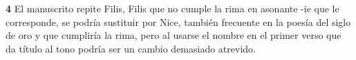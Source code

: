 \noindent\textbf{4} El manuscrito repite Filis, Filis que no cumple la rima en asonante -ie que le corresponde, se podría sustituir por Nice, también frecuente en la poesía del siglo de oro y que cumpliría la rima, pero al usarse el nombre en el primer verso que da título al tono podría ser un cambio demasiado atrevido.
